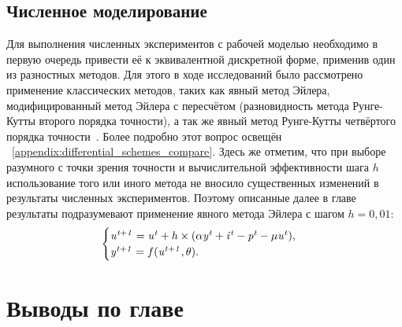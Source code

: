 \subsection{Численное моделирование}

Для выполнения численных экспериментов с рабочей моделью необходимо в первую очередь привести её к эквивалентной дискретной форме, применив один из разностных методов. Для этого в ходе исследований было рассмотрено применение классических методов, таких как явный метод Эйлера, модифицированный метод Эйлера с пересчётом (разновидность метода Рунге-Кутты второго порядка точности), а так же явный метод Рунге-Кутты четвёртого порядка точности~\cite{Hairer1990}. Более подробно этот вопрос освещён \inappendix~\ref{appendix:differential_schemes_compare}. Здесь же отметим, что при выборе разумного с точки зрения точности и вычислительной эффективности шага $h$ использование того или иного метода не вносило существенных изменений в результаты численных экспериментов. Поэтому описанные далее в главе результаты подразумевают применение явного метода Эйлера с шагом $h = 0,01$:
\begin{equation*}
    \begin{cases}
        \mathit{u^{t+1}} = \mathit{u^{t}} + h \times ( \alpha\mathit{y^{t}} + \mathit{i^{t}} - \mathit{p^{t}} - \mu\mathit{u^{t}} ), \\ 
        \mathit{y^{t+1}} = f(\mathit{u^{t+1}}, \theta).
    \end{cases}
\end{equation*}

\section{Выводы по главе \thechapter} \label{section:neuron_concls}



